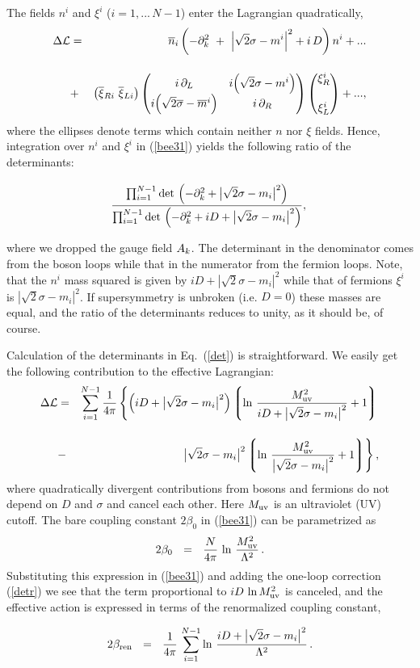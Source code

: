\documentclass[epsfig,12pt]{article}
\def\beq{\begin{equation}}
\def\eeq{\end{equation}}
\def\beqn{\begin{eqnarray}}
\def\eeqn{\end{eqnarray}}
\newcommand{\cell}{{\mathcal L}}
\newcommand{\pt}{\partial}
\def\beqn{\begin{eqnarray}}
\def\eeqn{\end{eqnarray}}
\def\beq{\begin{equation}}
\def\eeq{\end{equation}}
\newcommand{\p}{\partial}
\newcommand{\ov}{\overline}
\newcommand{\lgr}{\left\lgroup}
\newcommand{\rgr}{\right\rgroup}
\newcommand{\nbar}{\ov{n}}
\newcommand{\bxi}{\ov{\xi}{}}
\newcommand{\bren}{{\beta_\text{ren}}}
\begin{document}
The fields $ n^i $ and $ \xi^i $  ($ i = 1,...\, N-1 $) enter the Lagrangian quadratically,
\beqn
\Delta\cell &=&
 \nbar{}_i 
		   \left( - \p_k^2 ~+~ \Bigl| \sqrt{2}\sigma - m^i \Bigr|^2 +  i\, D \right) n^i
		   + ...
\nonumber\\[4mm]
&+&
\left( \bxi_{Ri}\,\,  \bxi_{Li} \right)
		\left( \begin{matrix}
			i\,\pt_L  &  
			i \Bigl(\sqrt{2}\sigma -  m^i\Bigr) \\
			i \Bigl(\sqrt{2}\ov{\sigma} - \ov{m}{}^i \Bigr) &  
			i\,\p_R 
		     \end{matrix} \right)
		\left( \begin{matrix}
			\xi_R^i \\[5mm] \xi_L^i
		     \end{matrix} \right)+ ... ,
\eeqn
where the ellipses denote terms which contain neither $n$ nor $\xi$ fields.
Hence, integration over $n^{i}$ and $\xi^i$ in (\ref{bee31})
yields the following ratio of the determinants:
\beq
 \frac{
\prod_{i=1}^{N-1} {\rm det}\, \left(-\pt_{k}^2 
   + \bigl| \sqrt{2}\sigma - m_i \bigr|^2\right)}{
\prod_{i=1}^{N-1}{\rm det}\, \left(-\pt_{k}^2 +iD
   + \bigl| \sqrt{2}\sigma - m_i \bigr|^2\right)},
\rule{0mm}{10mm}
\label{det}
\eeq
where we dropped the gauge field $A_k\rule{0mm}{5mm}$. The  determinant in the denominator
comes from the
boson loops while that in the numerator from the fermion loops. Note, that the $n^{i}$ mass 
squared
 is given by $iD+|\sqrt{2}\sigma-m_i|^2$ while that of fermions $\xi^i$
is $|\sqrt{2}\sigma-m_i|^2$. If supersymmetry is unbroken (i.e.  $D=0$) these masses are equal,
and the ratio of the determinants reduces to unity, as
it should be, of course.

Calculation of the determinants in Eq.~(\ref{det}) 
is straightforward. 
We easily get the following contribution to the
effective Lagrangian:
\beqn
\Delta{\mathcal  L} 
&=&
\sum_{i=1}^{N-1}\frac{1}{4\pi}\left\{\left(iD+\bigl|\sqrt{2}\sigma-m_i\bigr|^2\right)
\lgr \ln\, {\frac{M_{\rm uv}^2}{iD + \bigl|\sqrt{2}\sigma-m_i\bigr|^2}} + 1 \rgr
\right.
\nonumber\\[4mm]
&-&
\left. 
\bigl|\sqrt{2}\sigma-m_i\bigr|^2
\lgr \ln\, {\frac{M_{\rm uv}^2}{\bigl|\sqrt{2}\sigma-m_i\bigr|^2}} + 1\rgr
\right\},
\label{detr}
\eeqn
where quadratically divergent contributions from bosons and fermions do
not depend on
$D$ and $\sigma$ and cancel each other. Here $M_{\rm uv}$ is an ultraviolet (UV) cutoff.
 The bare coupling constant
 $2\beta_0$ in (\ref{bee31}) can be parametrized as
\beq
2\beta_0~~=~~\frac{N}{4\pi}\, \ln\, {\frac{M_{\rm uv}^2}{\Lambda^2}}\,.
\eeq
Substituting this expression in (\ref{bee31}) and adding 
the one-loop correction
(\ref{detr})
we see that the term proportional to 
$iD \,\ln {M_{\rm uv}^2}$ is canceled, and the effective action is
expressed in terms of the renormalized coupling constant,
\beq
\rule{0mm}{8mm}
	2\bren~~=~~\frac{1}{4\pi}\, 
	\sum_{i=1}^{N-1}\ln\, {\frac{iD +\bigl|\sqrt{2}\sigma-m_i\bigr|^2}{\Lambda^2}}\, .
\label{coupling}
\eeq
\end{document}
